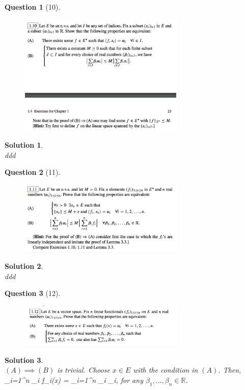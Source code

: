 \documentclass{article} %
\def\eQb#1\eQe{\begin{eqnarray*}#1\end{eqnarray*}}
\theoremstyle{quest}
\newtheorem*{question}{Question}
\newtheorem*{solution}{Solution}
\begin{document}
\newpage

\begin{question}[10]
\hfill
\begin{figure}[h!]
  \centering
    \includegraphics[width=0.7\textwidth]{funcA-1-10.png}
\end{figure}
\end{question}
\begin{solution} \hfill \\
ddd
\end{solution}
\newpage

\begin{question}[11]
\hfill
\begin{figure}[h!]
  \centering
    \includegraphics[width=0.7\textwidth]{funcA-1-11.png}
\end{figure}
\end{question}
\begin{solution} \hfill \\
ddd
\end{solution}

\newpage

\begin{question}[12]
\hfill
\begin{figure}[h!]
  \centering
    \includegraphics[width=0.7\textwidth]{funcA-1-12.png}
\end{figure}
\end{question}
\begin{solution} \hfill \\
$(A) \implies (B)$ is trivial. Choose $x \in E$ with the condition in $(A)$. Then,
\eQb
\sum_{i=1}^{n} \beta_i f_i(x) = \sum_{i=1}^{n} \beta_i \alpha_i,
\eQe
for any $\beta_1,...,\beta_n \in \mathbb{R}$. 
\end{solution}
\newpage
\end{document}
